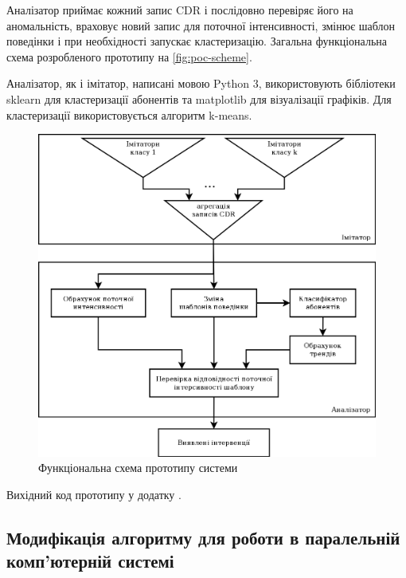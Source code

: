Аналізатор приймає кожний запис CDR і послідовно перевіряє його на аномальність, враховує новий запис для поточної інтенсивності, змінює шаблон поведінки і при необхідності запускає кластеризацію. Загальна функціональна схема розробленого прототипу на \autoref{fig:poc-scheme}.

Аналізатор, як і імітатор, написані мовою Python 3, використовують бібліотеки sklearn для кластеризації абонентів та matplotlib для візуалізації графіків. Для кластеризації використовується алгоритм k-means.

\begin{figure}[h]
        \begin{center}
            \includegraphics[scale=0.4]{resources/System-mini.png}
        \end{center}
        \caption{Функціональна схема прототипу системи}
        \label{fig:poc-scheme}
\end{figure}

Вихідний код прототипу у додатку \TBD.

\subsection{Модифікація алгоритму для роботи в паралельній комп'ютерній системі}

